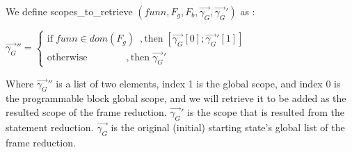 \documentclass[UTF8]{article}
\begin{document}
We define scopes\_to\_retrieve $( funn, F_g , F_b , \overrightarrow{\gamma_G}, \overrightarrow{\gamma_G}')$ as : \vspace{10pt}

 $  \overrightarrow{\gamma_G}'' =\begin{cases}
            \mathrm{if} \; funn \in dom(F_g)    \hspace{6pt} ,
            \mathrm{then} \; [\overrightarrow{\gamma_G}[0];\overrightarrow{\gamma_G}'[1]]  \\
            \mathrm{otherwise}    \hspace{48pt}     , 
            \mathrm{then} \; \overrightarrow{\gamma_G}' 
        \end{cases}$   \vspace{10pt}

Where $\overrightarrow{\gamma_G}''$ is a list of two elements, index 1 is the global scope, and index 0 is the programmable block global scope, and we will retrieve it to be added as the resulted scope of the frame reduction.
$\overrightarrow{\gamma_G}'$ is the scope that is resulted from the statement reduction. 
$\overrightarrow{\gamma_G}$ is the original (initial) starting state's global list of the frame reduction. 
\end{document}
